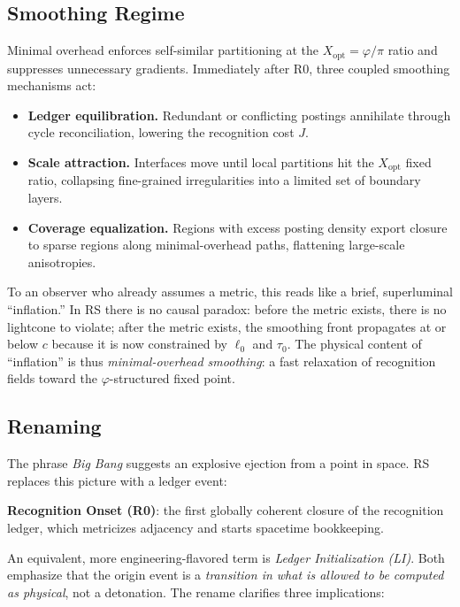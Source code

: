 \documentclass[11pt]{article}
\theoremstyle{definition}
\theoremstyle{remark}
\begin{document}
\subsection{Smoothing Regime}
Minimal overhead enforces self-similar partitioning at the \(X_{\mathrm{opt}}=\varphi/\pi\) ratio and suppresses unnecessary gradients. Immediately after R0, three coupled smoothing mechanisms act:

\begin{itemize}
\item \textbf{Ledger equilibration.} Redundant or conflicting postings annihilate through cycle reconciliation, lowering the recognition cost \(J\).
\item \textbf{Scale attraction.} Interfaces move until local partitions hit the \(X_{\mathrm{opt}}\) fixed ratio, collapsing fine-grained irregularities into a limited set of boundary layers.
\item \textbf{Coverage equalization.} Regions with excess posting density export closure to sparse regions along minimal-overhead paths, flattening large-scale anisotropies.
\end{itemize}

To an observer who already assumes a metric, this reads like a brief, superluminal “inflation.” In RS there is no causal paradox: before the metric exists, there is no lightcone to violate; after the metric exists, the smoothing front propagates at or below \(c\) because it is now constrained by \(\ell_0\) and \(\tau_0\). The physical content of “inflation” is thus \emph{minimal-overhead smoothing}: a fast relaxation of recognition fields toward the \(\varphi\)-structured fixed point.

\subsection{Renaming}
The phrase \emph{Big Bang} suggests an explosive ejection from a point in space. RS replaces this picture with a ledger event:

\begin{center}
\textbf{Recognition Onset (R0)}: the first globally coherent closure of the recognition ledger, which metricizes adjacency and starts spacetime bookkeeping.
\end{center}

An equivalent, more engineering-flavored term is \emph{Ledger Initialization (LI)}. Both emphasize that the origin event is a \emph{transition in what is allowed to be computed as physical}, not a detonation. The rename clarifies three implications:
\end{document}
